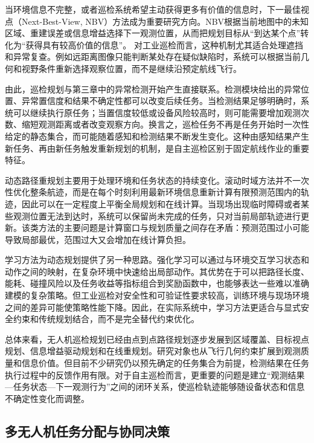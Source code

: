 当环境信息不完整，或者巡检系统希望主动获得更多有价值的信息时，下一最佳视点（Next-Best-View, NBV）方法成为重要研究方向。NBV根据当前地图中的未知区域、重建误差或信息增益选择下一观测位置，从而把规划目标从“到达某个点”转化为“获得具有较高价值的信息”\cite{Bircher2016,Zeng2020,gazani2023bagofviews,ruckin2022adaptiveipp}。 对工业巡检而言，这种机制尤其适合处理遮挡和异常复查。例如远距离图像只能判断某处存在疑似缺陷时，系统可以根据当前几何和视野条件重新选择观察位置，而不是继续沿预定航线飞行。

由此，巡检规划与第三章中的异常检测开始产生直接联系。检测模块给出的异常位置、异常置信度和结果不确定性都可以改变后续任务。当检测结果足够明确时，系统可以继续执行原任务；当置信度较低或设备风险较高时，则可能需要增加观测次数、缩短观测距离或者改变观察方向。换言之，巡检任务不再是任务开始时一次性给定的静态集合，而可能随着感知和检测结果不断发生变化。这种由感知结果产生新任务、再由新任务触发重新规划的机制，是自主巡检区别于固定航线作业的重要特征。

动态路径重规划主要用于处理环境和任务状态的持续变化。滚动时域方法并不一次性优化整条航迹，而是在每个时刻利用最新环境信息重新计算有限预测范围内的轨迹，因此可以在一定程度上平衡全局规划和在线计算\cite{Papaioannou2022,petit2024moar,ruckin2022adaptiveipp}。当现场出现临时障碍或者某些观测位置无法到达时，系统可以保留尚未完成的任务，只对当前局部轨迹进行更新。该类方法的主要问题是计算窗口与规划质量之间存在矛盾：预测范围过小可能导致局部最优，范围过大又会增加在线计算负担。

学习方法为动态规划提供了另一种思路。强化学习可以通过与环境交互学习状态和动作之间的映射，在复杂环境中快速给出局部动作\cite{Kober2013,westheider2023multiipp,ruckin2022adaptiveipp}。其优势在于可以把路径长度、能耗、碰撞风险以及任务收益等指标组合到奖励函数中，也能够表达一些难以准确建模的复杂策略。但工业巡检对安全性和可验证性要求较高，训练环境与现场环境之间的差异可能使策略性能下降。因此，在实际系统中，学习方法更适合与显式安全约束和传统规划结合，而不是完全替代约束优化。

总体来看，无人机巡检规划已经由点到点路径规划逐步发展到区域覆盖、目标视点规划、信息增益驱动规划和在线重规划。研究对象也从飞行几何约束扩展到观测质量和信息价值。但目前不少研究仍以预先确定的任务集合为前提，检测结果在任务执行过程中的反馈作用有限。对于自主巡检而言，更重要的问题是建立“观测结果—任务状态—下一观测行为”之间的闭环关系，使巡检轨迹能够随设备状态和信息不确定性变化而调整。

\subsection{多无人机任务分配与协同决策}

